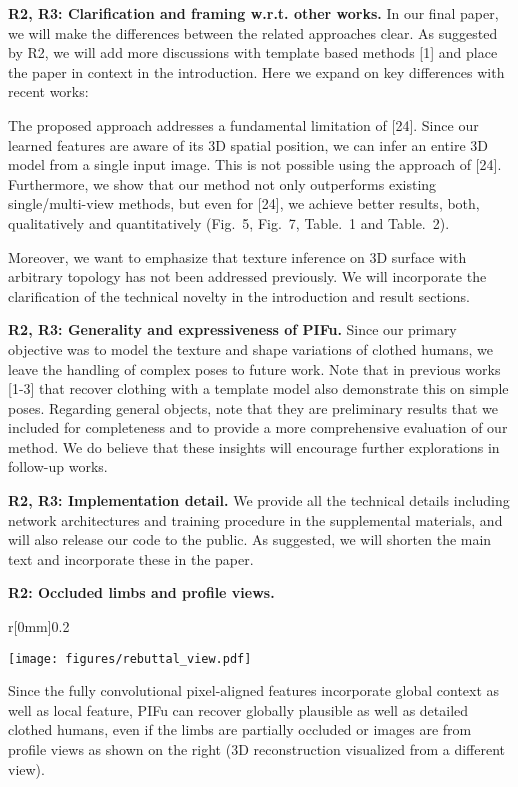 \documentclass[10pt,twocolumn, letterpaper]{article}
\begin{document}
\noindent\textbf{R2, R3: Clarification and framing w.r.t. other works.}
In our final paper, we will make the differences between the related approaches clear. As suggested by R2, we will add more discussions with template based methods [1] and place the paper in context in the introduction. Here we expand on key differences with recent works:

The proposed approach addresses a fundamental limitation of [24]. Since our learned features are aware of its 3D spatial position, we can infer an entire 3D model from a single input image. This is not possible using the approach of [24]. Furthermore, we show that our method not only outperforms existing single/multi-view methods, but even for [24], we achieve better results, both, qualitatively and quantitatively (Fig.~5, Fig.~7, Table.~1 and Table.~2).

Moreover, we want to emphasize that texture inference on 3D surface with arbitrary topology has not been addressed previously. We will incorporate the clarification of the technical novelty in the introduction and result sections. 

\noindent\textbf{R2, R3: Generality and expressiveness of PIFu.}
Since our primary objective was to model the texture and shape variations of clothed humans, we leave the handling of complex poses to future work. Note that in previous works [1-3] that recover clothing with a template model also demonstrate this on simple poses. Regarding general objects, note that they are preliminary results that we included for completeness and to provide a more comprehensive evaluation of our method. We do believe that these insights will encourage further explorations in follow-up works.

\noindent\textbf{R2, R3: Implementation detail.}
We provide all the technical details including network architectures and training procedure in the supplemental materials, and will also release our code to the public. As suggested, we will shorten the main text and incorporate these in the paper.

\noindent\textbf{R2: Occluded limbs and profile views.}

\begin{wrapfigure}{r}[0mm]{0.2\textwidth}
	\vspace*{-7mm}
	\begin{center}
        \hspace*{-6.2mm}
		\texttt{[image: figures/rebuttal\_view.pdf]}
	\end{center}
	\vspace*{-6.8mm}
\end{wrapfigure}
Since the fully convolutional pixel-aligned features incorporate global context as well as local feature, PIFu can recover globally plausible as well as detailed clothed humans, even if the limbs are partially occluded or images are from profile views as shown on the right (3D reconstruction visualized from a different view).
\end{document}
